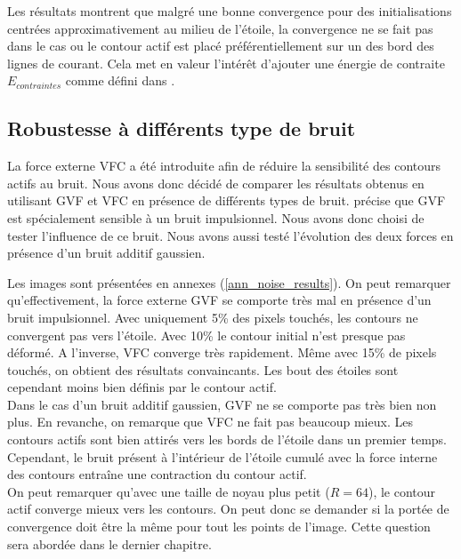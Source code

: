 Les résultats montrent que malgré une bonne convergence pour des initialisations centrées approximativement au milieu de l'étoile, la convergence ne se fait pas dans le cas ou le contour actif est placé préférentiellement sur un des bord des lignes de courant. Cela met en valeur l'intérêt d'ajouter une énergie de contraite $E_{contraintes}$ comme défini dans \cite{kaas}. 


\subsection{Robustesse à différents type de bruit}
La force externe VFC a été introduite afin de réduire la sensibilité des contours actifs au bruit. Nous avons donc décidé de comparer les résultats obtenus en utilisant GVF et VFC en présence de différents types de bruit. \cite{vfc} précise que GVF est spécialement sensible à un bruit impulsionnel. Nous avons donc choisi de tester l'influence de ce bruit. Nous avons aussi testé l'évolution des deux forces en présence d'un bruit additif gaussien. 

Les images sont présentées en annexes (\ref{ann_noise_results}). On peut remarquer qu'effectivement, la force externe GVF se comporte très mal en présence d'un bruit impulsionnel. Avec uniquement 5\% des pixels touchés, les contours ne convergent pas vers l'étoile. Avec 10\% le contour initial n'est presque pas déformé. A l'inverse, VFC converge très rapidement. Même avec 15\% de pixels touchés, on obtient des résultats convaincants. Les bout des étoiles sont cependant moins bien définis par le contour actif.\\

Dans le cas d'un bruit additif gaussien, GVF ne se comporte pas très bien non plus. En revanche, on remarque que VFC ne fait pas beaucoup mieux. Les contours actifs sont bien attirés vers les bords de l'étoile dans un premier temps. Cependant, le bruit présent à l'intérieur de l'étoile cumulé avec la force interne des contours entraîne une contraction du contour actif.\\

On peut remarquer qu'avec une taille de noyau plus petit ($R = 64$), le contour actif converge mieux vers les contours. On peut donc se demander si la portée de convergence doit être la même pour tout les points de l'image. Cette question sera abordée dans le dernier chapitre.
